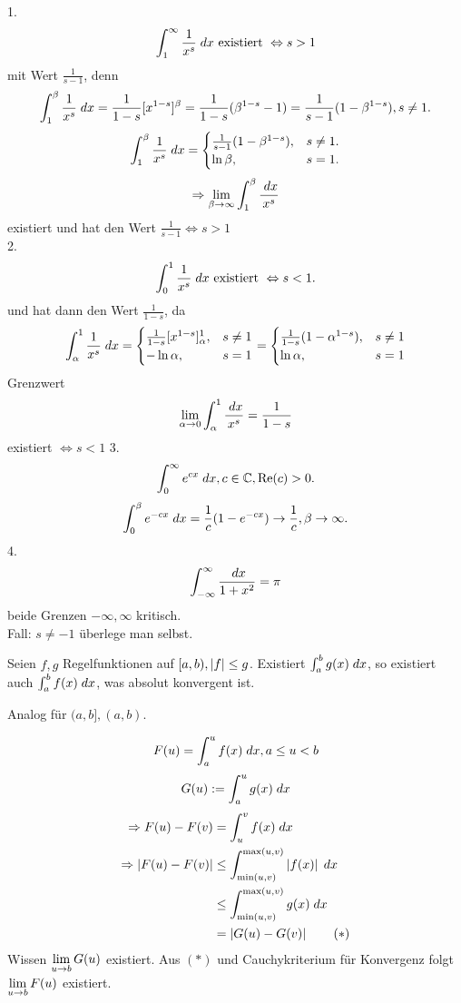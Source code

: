 \documentclass[../ana2.tex]{subfiles}
\begin{document}
\begin{bsp}
    1.
    \[ \integral{\frac{1}{x^s}}{1}{\infty} 
    \text{ existiert } \Leftrightarrow s > 1 \]
    mit Wert \( \frac{1}{s-1} \), denn 
    \[ \integral{\frac{1}{x^s}}{1}{\beta} 
    = \frac{1}{1-s} [x^{1-s}]^\beta 
    = \frac{1}{1-s} (\beta^{1-s} - 1)
    = \frac{1}{s-1} (1 - \beta^{1-s}), s \neq 1. \]
    \[ \integral{\frac{1}{x^s}}{1}{\beta} 
    = \begin{cases}
        \frac{1}{s-1}(1 - \beta^{1-s}), &s \neq 1.\\
        \ln \beta, &s = 1.
    \end{cases} \]
    \[ \Rightarrow \limes{\beta} \int_1^\beta \frac{\dx}{x^s} \]
    existiert und hat den Wert 
    \( \frac{1}{s-1} \Leftrightarrow s > 1 \) \\
    2.
    \[ \integral{\frac{1}{x^s}}{0}{1} 
    \text{ existiert } \Leftrightarrow s < 1. \]
    und hat dann den Wert \( \frac{1}{1-s} \), da
    \[ \integral{\frac{1}{x^s}}{\alpha}{1} 
    = \begin{cases}
        \frac{1}{1-s} [x^{1-s}]_\alpha^1, &s \neq 1\\
        -\ln \alpha, &s = 1
    \end{cases}
    = \begin{cases}
        \frac{1}{1-s} (1-\alpha^{1-s}), &s \neq 1\\
        \ln \alpha, &s = 1
    \end{cases} \]    
    Grenzwert
    \[ \limesx{\alpha}{0} \int_\alpha^1 \frac{\dx}{x^s} = \frac{1}{1-s} \]
    existiert \( \Leftrightarrow s < 1 \)
    3.
    \[ \integral{e^{cx}}{0}{\infty}, c\in\C, \Re(c) > 0. \]    
    \[ \integral{e^{-cx}}{0}{\beta} 
    = \frac{1}{c} (1-e^{-cx}) \rightarrow \frac{1}{c}, 
    \beta \rightarrow \infty. \]
    4. 
    \[ \int_{-\infty}^\infty \frac{\dx}{1+x^2} = \pi \]
    beide Grenzen \( -\infty, \infty \) kritisch. \\
    Fall: \(s \neq -1\) überlege man selbst.
\end{bsp}
\begin{satz}[Majorantenkriterium]
    Seien \( f,g \) Regelfunktionen auf 
    \( [a,b), \abs{f} \leq g \). 
    Existiert \( \integral{g(x)}{a}{b} \), so existiert 
    auch \( \integral{f(x)}{a}{b} \), was 
    absolut konvergent ist.
\end{satz}
\begin{bem}
    Analog für \( (a,b], (a,b) \).
\end{bem}
\begin{bew}
    \[ F(u) = \integral{f(x)}{a}{u}, a \leq u < b \]
    \[ G(u) := \integral{g(x)}{a}{u} \]
    \begin{align*}
        \Rightarrow F(u) - F(v) 
        &= \integral{f(x)}{u}{v}  \\
        \Rightarrow \abs{F(u) - F(v)} 
        &\leq \integral{\abs{f(x)}}{\min(u,v)}{\max(u,v)} \\
        &\leq \integral{g(x)}{\min(u,v)}{\max(u,v)} \\
        &= \abs{G(u) - G(v)} \tag{\(*\)}
    \end{align*}
    Wissen \( \limesx{u}{b} G(u) \) existiert.
    Aus \( (*) \) und Cauchykriterium für Konvergenz 
    folgt \( \limesx{u}{b} F(u) \) existiert.
\end{bew}
\end{document}
